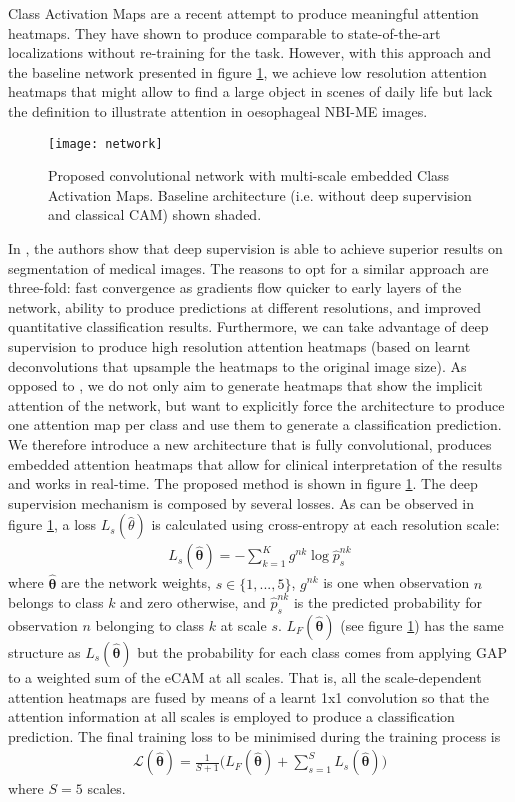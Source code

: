 \documentclass[runningheads]{llncs}
\begin{document}
Class Activation Maps \cite{Zhou2015} are a recent attempt to produce meaningful attention heatmaps. They have shown to produce comparable to state-of-the-art localizations without re-training for the task. However, with this approach and the baseline network presented in figure \ref{fig:network}, we achieve low resolution attention heatmaps that might allow to find a large object in scenes of daily life but lack the definition to illustrate attention in oesophageal NBI-ME images.
\begin{figure}[b!]
	\centering
	\texttt{[image: network]}
	\caption{Proposed convolutional network with multi-scale embedded Class Activation Maps. Baseline architecture (i.e. without deep supervision and classical CAM) shown shaded.}
	\label{fig:network}
\end{figure}
In \cite{Garcia-Peraza-Herrera2017}, the authors show that deep supervision is able to achieve superior results on segmentation of medical images. The reasons to opt for a similar approach are three-fold: fast convergence as gradients flow quicker to early layers of the network, ability to produce predictions at different resolutions, and improved quantitative classification results. Furthermore, we can take advantage of deep supervision to produce high resolution attention heatmaps (based on learnt deconvolutions that upsample the heatmaps to the original image size). As opposed to \cite{Zhou2015}, we do not only aim to generate heatmaps that show the implicit attention of the network, but want to explicitly force the architecture to produce one attention map per class and use them to generate a classification prediction. We therefore introduce a new architecture that is fully convolutional, produces embedded attention heatmaps that allow for clinical interpretation of the results and works in real-time. The proposed method is shown in figure \ref{fig:network}. The deep supervision mechanism is composed by several losses. As can be observed in figure \ref{fig:network}, a loss $L_s(\hat{\theta})$ is calculated using cross-entropy at each resolution scale:
\begin{align}
L_s(\hat{\boldsymbol{\theta}}) = - \sum_{k=1}^{K} g^{nk} \log{\hat{p}_s^{nk}}
\end{align}
where $\hat{\boldsymbol{\theta}}$ are the network weights, $s \in \{1, ..., 5\}$, $g^{nk}$ is one when observation $n$ belongs to class $k$ and zero otherwise, and $\hat{p}_s^{nk}$ is the predicted probability for observation $n$ belonging to class $k$ at scale $s$. $L_F(\hat{\boldsymbol{\theta}})$ (see figure \ref{fig:network}) has the same structure as $L_s(\hat{\boldsymbol{\theta}})$ but the probability for each class comes from applying GAP to a weighted sum of the eCAM at all scales. That is, all the scale-dependent attention heatmaps are fused by means of a learnt 1x1 convolution so that the attention information at all scales is employed to produce a classification prediction. The final training loss to be minimised during the training process is
\begin{align}
\mathcal{L}(\hat{\boldsymbol{\theta}}) = \frac{1}{S + 1}\biggl(L_F(\hat{\boldsymbol{\theta}}) + \sum_{s=1}^{S}L_s(\hat{\boldsymbol{\theta}})\biggr)
\end{align}
where $S = 5$ scales.
\end{document}
